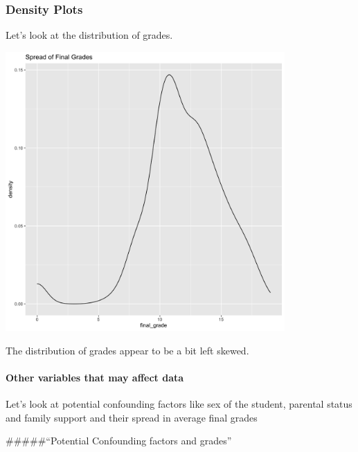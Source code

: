 \documentclass[]{article}
\let\oldparagraph\paragraph
\renewcommand{\paragraph}[1]{\oldparagraph{#1}\mbox{}}
\begin{document}
\hypertarget{density-plots}{%
\subsubsection{Density Plots}\label{density-plots}}

Let's look at the distribution of grades.

\includegraphics[width=0.8\textwidth,height=\textheight]{images/density_plot_grades.png}

The distribution of grades appear to be a bit left skewed.

\hypertarget{other-variables-that-may-affect-data}{%
\paragraph{Other variables that may affect
data}\label{other-variables-that-may-affect-data}}

Let's look at potential confounding factors like sex of the student,
parental status and family support and their spread in average final
grades

\#\#\#\#\#``Potential Confounding factors and grades''
\end{document}
